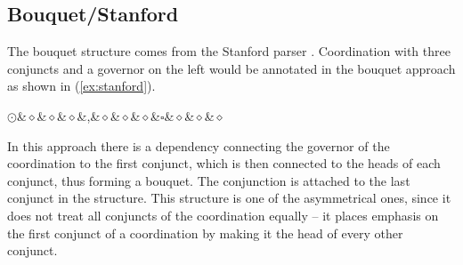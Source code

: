 \subsection{Bouquet/Stanford}
The bouquet structure comes from the Stanford parser \citep{de-marneffe-etal-2006-generating}. Coordination with three conjuncts and a governor on the left would be annotated in the bouquet approach as shown in (\ref{ex:stanford}).

\begin{exe}
\centering
\ex\label{ex:stanford}
\begin{dependency}[theme = simple, baseline=-\the\dimexpr\fontdimen22\textfont2\relax]
        \begin{deptext}
        $\odot$\&$\diamond$\&$\diamond$\&$\diamond$\&,\&$\diamond$\&$\diamond$\&$\diamond$\&$\square$\&$\diamond$\&$\diamond$\&$\diamond$\\
            \end{deptext}
        \end{dependency}
\end{exe}

In this approach there is a dependency connecting the governor of the coordination to the first conjunct, which is then connected to the heads of each conjunct, thus forming a bouquet. The conjunction is attached to the last conjunct in the structure. This structure is one of the asymmetrical ones, since it does not treat all conjuncts of the coordination equally -- it places emphasis on the first conjunct of a coordination by making it the head of every other conjunct. 

\vspace{-0.5\treeheight}

